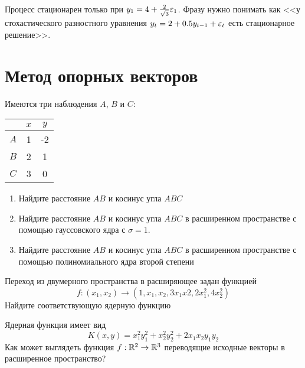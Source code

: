 \documentclass[pdftex,11pt,openany]{book}\usepackage[]{graphicx}\usepackage[]{color}
\begin{document}
\begin{solution}
Процесс стационарен только при $y_1=4+\frac{2}{\sqrt{3}}\varepsilon_1$. Фразу нужно понимать как <<у стохастического разностного уравнения $y_t=2+0.5y_{t-1}+\varepsilon_t$ есть стационарное решение>>.
\end{solution}





\chapter{Метод опорных векторов}


\begin{problem}
Имеются три наблюдения $A$, $B$ и $C$:

\begin{tabular}{ccc}
 & $x$ & $y$ \\ 
\hline 
$A$ & 1 & -2 \\ 
$B$ & 2 & 1 \\ 
$C$ & 3 & 0 \\ 
\end{tabular} 

\begin{enumerate}
\item Найдите расстояние $AB$ и косинус угла $ABC$
\item Найдите расстояние $AB$ и косинус угла $ABC$ в расширенном пространстве с помощью гауссовского ядра с $\sigma=1$.
\item Найдите расстояние $AB$ и косинус угла $ABC$ в расширенном пространстве с помощью полиномиального ядра второй степени
\end{enumerate}
\end{problem}

\begin{solution}
\end{solution}

\begin{problem}
Переход из двумерного пространства в расширяющее задан функцией 
\[
f : (x_1,x_2) \to (1,x_1,x_2,3x_1 x2, 2x_1^2, 4x_2^2)
\]
Найдите соответствующую ядерную функцию
\end{problem}

\begin{solution}
\end{solution}


\begin{problem}
Ядерная функция имеет вид 
\[
K(x,y)=x_1^2y_1^2+x_2^2y_2^2+2x_1x_2y_1y_2
\]
Как может выглядеть функция $f:\mathbb R^2\rightarrow\mathbb R^3$ переводящие исходные векторы в расширенное пространство?
\end{problem}
\end{document}
